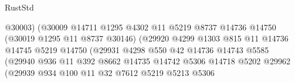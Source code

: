 \begin{lexlean}{RustStd}
\begin{coremodule}
                                              @30003)
                                            (@30009
                                              @14711
                                              @1295
                                              @4302
                                              @11
                                              @5219
                                              @8737
                                              @14736
                                              @14750
                                              (@30019 @1295 @11 @8737 @30146)
                                              (@29920
                                                @4299
                                                @1303
                                                @815
                                                @11
                                                @14736
                                                @14745
                                                @5219
                                                @14750
                                                (@29931
                                                  @4298
                                                  @550
                                                  @42
                                                  @14736
                                                  @14743
                                                  @5585
                                                  (@29940
                                                    @936
                                                    @11
                                                    @392
                                                    @8662
                                                    @14735
                                                    @14742
                                                    @5306
                                                    @14718
                                                    @5202
                                                    @29962
                                                    (@29939
                                                      @934
                                                      @100
                                                      @11
                                                      @32
                                                      @7612
                                                      @5219
                                                      @5213
                                                      @5306

\end{coremodule}
\end{lexlean}
